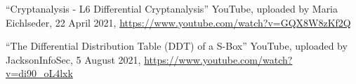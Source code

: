 \begin{thebibliography}{99}
	
``Cryptanalysis - L6 Differential Cryptanalysis'' YouTube, uploaded by 
Maria Eichlseder, 22 April 2021, \url{https://www.youtube.com/watch?v=GQX8W8zKf2Q}

``The Differential Distribution Table (DDT) of a S-Box'' YouTube, uploaded by 
JacksonInfoSec, 5 August 2021, \url{https://www.youtube.com/watch?v=di90_oL4lxk}

	
\end{thebibliography}